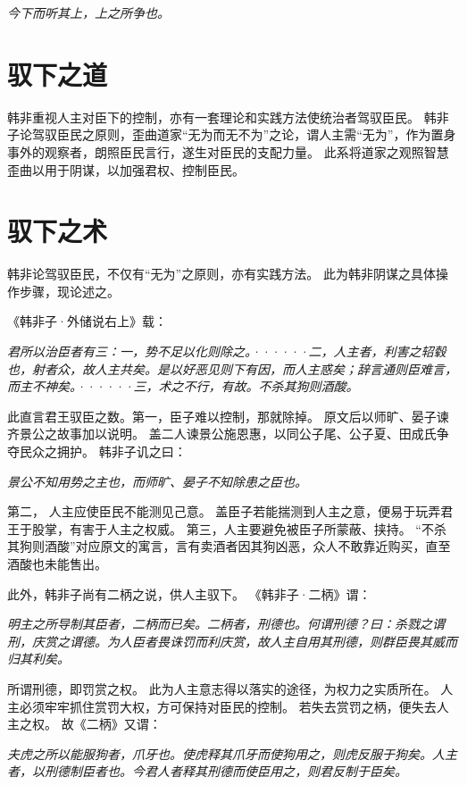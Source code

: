 \documentclass[11pt]{article}
\begin{document}
\textit{今下而听其上，上之所争也。}
  
\section{驭下之道}
韩非重视人主对臣下的控制，亦有一套理论和实践方法使统治者驾驭臣民。
韩非子论驾驭臣民之原则，歪曲道家“无为而无不为”之论，谓人主需“无为”，作为置身事外的观察者，朗照臣民言行，遂生对臣民的支配力量。
此系将道家之观照智慧歪曲以用于阴谋，以加强君权、控制臣民。

\section{驭下之术}
韩非论驾驭臣民，不仅有“无为”之原则，亦有实践方法。
此为韩非阴谋之具体操作步骤，现论述之。

\newline

《韩非子·外储说右上》载：

\textit{君所以治臣者有三：一，势不足以化则除之。······二，人主者，利害之轺毂也，射者众，故人主共矣。是以好恶见则下有因，而人主惑矣；辞言通则臣难言，而主不神矣。······三，术之不行，有故。不杀其狗则酒酸。}

此直言君王驭臣之数。第一，臣子难以控制，那就除掉。
原文后以师旷、晏子谏齐景公之故事加以说明。
盖二人谏景公施恩惠，以同公子尾、公子夏、田成氏争夺民众之拥护。
韩非子讥之曰：

\textit{景公不知用势之主也，而师旷、晏子不知除患之臣也。}
      
第二， 人主应使臣民不能测见己意。
盖臣子若能揣测到人主之意，便易于玩弄君王于股掌，有害于人主之权威。
第三，人主要避免被臣子所蒙蔽、挟持。
“不杀其狗则酒酸”对应原文的寓言，言有卖酒者因其狗凶恶，众人不敢靠近购买，直至酒酸也未能售出。

\newline

此外，韩非子尚有二柄之说，供人主驭下。
《韩非子·二柄》谓：

\textit{明主之所导制其臣者，二柄而已矣。二柄者，刑德也。何谓刑德？曰：杀戮之谓刑，庆赏之谓德。为人臣者畏诛罚而利庆赏，故人主自用其刑德，则群臣畏其威而归其利矣。}

所谓刑德，即罚赏之权。
此为人主意志得以落实的途径，为权力之实质所在。
人主必须牢牢抓住赏罚大权，方可保持对臣民的控制。
若失去赏罚之柄，便失去人主之权。
故《二柄》又谓：

\textit{夫虎之所以能服狗者，爪牙也。使虎释其爪牙而使狗用之，则虎反服于狗矣。人主者，以刑德制臣者也。今君人者释其刑德而使臣用之，则君反制于臣矣。}
\end{document}
